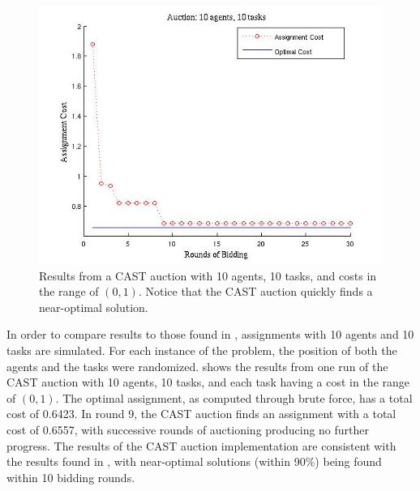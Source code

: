 \begin{figure}[ht]
	\centering
	\includegraphics[scale=.65]{Figures/CAST_10.jpg}
\caption[Results from an example CAST auction.]{Results from a CAST auction with 10 agents, 10 tasks, and costs in the range of $(0,1)$.  Notice that the CAST auction quickly finds a near-optimal solution.}
\label{fig:Cast10}
\end{figure}

In order to compare results to those found in \cite{palmer:CAST}, assignments with 10 agents and 10 tasks are simulated.  For each instance of the problem, the position of both the agents and the tasks were randomized.   shows the results from one run of the CAST auction with 10 agents, 10 tasks, and each task having a cost in the range of $(0,1)$.  The optimal assignment, as computed through brute force, has a total cost of 0.6423.  In round 9, the CAST auction finds an assignment with a total cost of 0.6557, with successive rounds of auctioning producing no further progress.  The results of the CAST auction implementation are consistent with the results found in \cite{palmer:CAST}, with near-optimal solutions (within 90\%) being found within 10 bidding rounds.  


